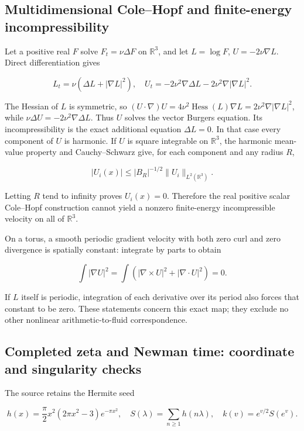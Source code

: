 \subsection{Multidimensional Cole--Hopf and finite-energy incompressibility}\label{multidimensional-colehopf-and-finite-energy-incompressibility}

Let a positive real \(F\) solve \(F_t=\nu \Delta F\) on \(\mathbb R^3\), and let \(L=\log F\), \(U=-2 \nu \nabla L\). Direct differentiation gives

\[
L_t=\nu(\Delta L+|\nabla L|^2),\quad
U_t=-2\nu^2\nabla\Delta L-2\nu^2\nabla|\nabla L|^2.
\]

The Hessian of \(L\) is symmetric, so \((U \cdot \nabla)U=4 \nu^2 \operatorname{Hess}(L) \nabla L=2 \nu^2 \nabla|\nabla L|^2\), while \(\nu \Delta U=-2 \nu^2 \nabla \Delta L\). Thus \(U\) solves the vector Burgers equation. Its incompressibility is the exact additional equation \(\Delta L=0\). In that case every component of \(U\) is harmonic. If \(U\) is square integrable on \(\mathbb R^3\), the harmonic mean-value property and Cauchy--Schwarz give, for each component and any radius \(R\),

\[
|U_i(x)|\le |B_R|^{-1/2}\|U_i\|_{L^2(\mathbb R^3)}.
\]

Letting \(R\) tend to infinity proves \(U_i(x)=0\). Therefore the real positive scalar Cole--Hopf construction cannot yield a nonzero finite-energy incompressible velocity on all of \(\mathbb R^3\).

On a torus, a smooth periodic gradient velocity with both zero curl and zero divergence is spatially constant: integrate by parts to obtain

\[
\int |\nabla U|^2=\int (|\nabla\times U|^2+|\nabla\cdot U|^2)=0.
\]

If \(L\) itself is periodic, integration of each derivative over its period also forces that constant to be zero. These statements concern this exact map; they exclude no other nonlinear arithmetic-to-fluid correspondence.

\subsection{Completed zeta and Newman time: coordinate and singularity checks}\label{completed-zeta-and-newman-time-coordinate-and-singularity-checks}

The source retains the Hermite seed

\[
h(x)=\frac\pi2x^2(2\pi x^2-3)e^{-\pi x^2},\quad
S(\lambda)=\sum_{n\ge1}h(n\lambda),\quad
k(v)=e^{v/2}S(e^v).
\]

